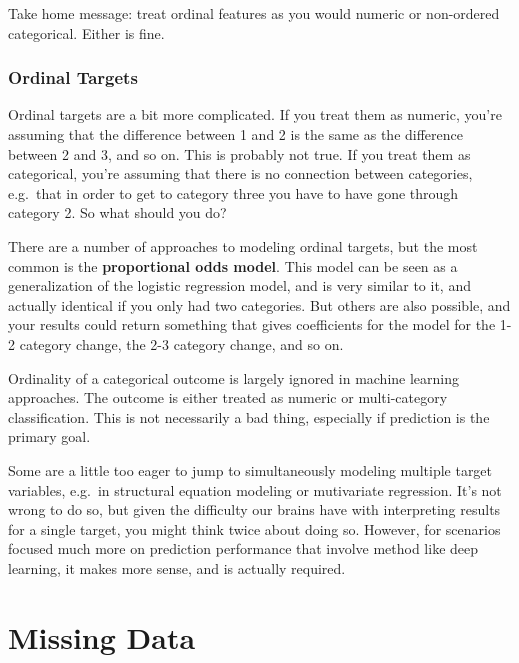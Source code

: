 \documentclass[
  letterpaper,
]{krantz}
\begin{document}
Take home message: treat ordinal features as you would numeric or
non-ordered categorical. Either is fine.

\subsubsection{Ordinal Targets}\label{ordinal-targets}

Ordinal targets are a bit more complicated. If you treat them as
numeric, you're assuming that the difference between 1 and 2 is the same
as the difference between 2 and 3, and so on. This is probably not true.
If you treat them as categorical, you're assuming that there is no
connection between categories, e.g.~that in order to get to category
three you have to have gone through category 2. So what should you do?

There are a number of approaches to modeling ordinal targets, but the
most common is the \textbf{proportional odds model}. This model can be
seen as a generalization of the logistic regression model, and is very
similar to it, and actually identical if you only had two categories.
But others are also possible, and your results could return something
that gives coefficients for the model for the 1-2 category change, the
2-3 category change, and so on.

Ordinality of a categorical outcome is largely ignored in machine
learning approaches. The outcome is either treated as numeric or
multi-category classification. This is not necessarily a bad thing,
especially if prediction is the primary goal.

\begin{tcolorbox}[enhanced jigsaw, colframe=quarto-callout-tip-color-frame, opacityback=0, breakable, left=2mm, rightrule=.15mm, toprule=.15mm, arc=.35mm, leftrule=.75mm, colback=white, bottomrule=.15mm]

Some are a little too eager to jump to simultaneously modeling multiple
target variables, e.g.~in structural equation modeling or mutivariate
regression. It's not wrong to do so, but given the difficulty our brains
have with interpreting results for a single target, you might think
twice about doing so. However, for scenarios focused much more on
prediction performance that involve method like deep learning, it makes
more sense, and is actually required.

\end{tcolorbox}

\section{Missing Data}\label{sec-missing-data}
\end{document}
